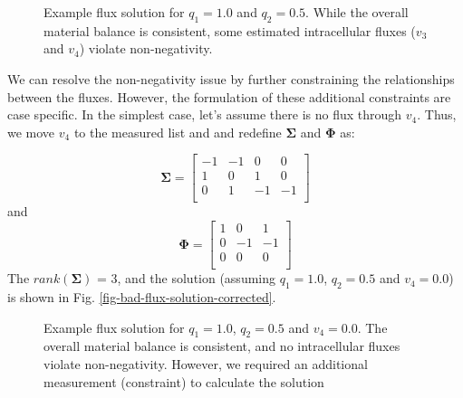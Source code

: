 \documentclass[11pt]{article}
\theoremstyle{definition}
\begin{document}
\begin{figure*}[h!]\centering
{}
\caption{Example flux solution for $q_{1} = 1.0$ and $q_{2} = 0.5$.
While the overall material balance is consistent, some estimated intracellular fluxes ($v_{3}$ and $v_{4}$) violate non-negativity.}\label{fig-bad-flux-solution}
\end{figure*}

We can resolve the non-negativity issue by further constraining the relationships between the fluxes.
However, the formulation of these additional constraints are case specific. In the simplest case, let's assume there is no flux through $v_{4}$.
Thus, we move $v_{4}$ to the measured list and and redefine $\mathbf{\Sigma}$ and $\mathbf{\Phi}$ as:

\begin{equation}
\mathbf{\Sigma} =
\begin{bmatrix}
	-1 & -1 & 0 & 0 \\
	1 & 0 & 1 & 0 \\
	0 & 1 & -1 & -1 \\
\end{bmatrix}
\end{equation} and
\begin{equation}
	\mathbf{\Phi} =
	\begin{bmatrix}
		1 & 0 & 1 \\
		0 & -1 & -1 \\
		0 & 0 & 0 \\
	\end{bmatrix}
\end{equation}
The $rank\left(\mathbf{\Sigma}\right)$ = 3, and the solution (assuming $q_{1} = 1.0$, $q_{2} = 0.5$ and $v_{4} = 0.0$) is shown in Fig. \eqref{fig-bad-flux-solution-corrected}.

\begin{figure*}[h!]\centering
{}
\caption{Example flux solution for $q_{1} = 1.0$, $q_{2} = 0.5$ and $v_{4} = 0.0$.
The overall material balance is consistent, and no intracellular fluxes violate non-negativity. However, we required an additional measurement (constraint) to calculate the solution}\label{fig-bad-flux-solution-corrected}
\end{figure*}

%
\end{document}

